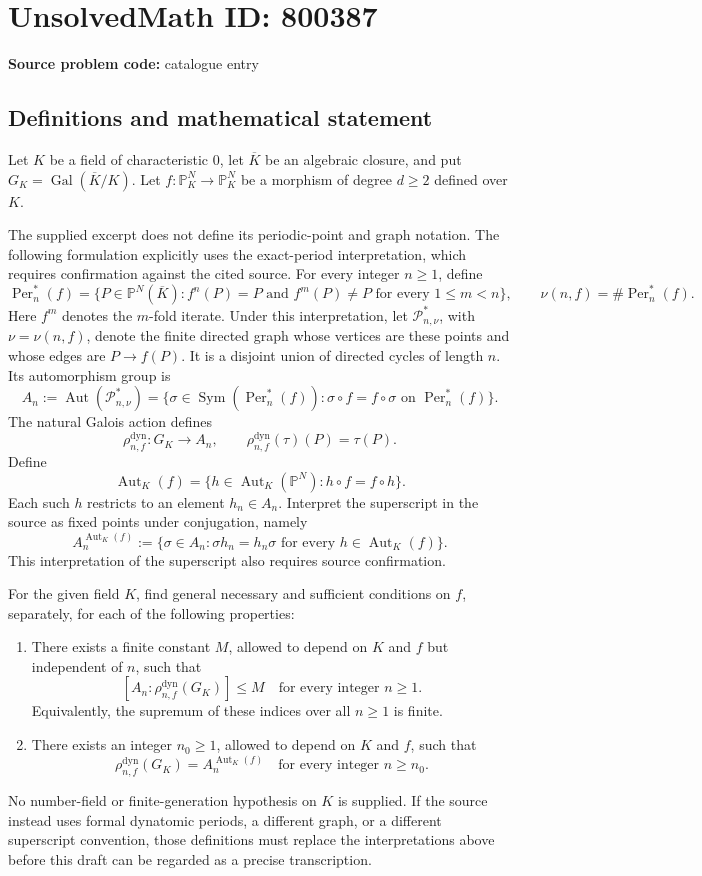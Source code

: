 \documentclass[11pt]{article}
\newcommand{\PP}{\mathbb{P}}
\begin{document}
\section*{UnsolvedMath ID: 800387}
\textbf{Source problem code:} catalogue entry
\subsection{Definitions and mathematical statement}
Let \(K\) be a field of characteristic \(0\), let \(\overline K\) be an algebraic closure, and put \(G_K=\operatorname{Gal}(\overline K/K)\). Let \(f:\PP^N_K\to\PP^N_K\) be a morphism of degree \(d\geq 2\) defined over \(K\).

The supplied excerpt does not define its periodic-point and graph notation. The following formulation explicitly uses the exact-period interpretation, which requires confirmation against the cited source. For every integer \(n\geq 1\), define
\[
\operatorname{Per}_n^*(f)=\{P\in\PP^N(\overline K): f^n(P)=P\text{ and }f^m(P)\neq P\text{ for every }1\leq m<n\},
\qquad \nu(n,f)=\#\operatorname{Per}_n^*(f).
\]
Here \(f^m\) denotes the \(m\)-fold iterate. Under this interpretation, let \(\mathcal P_{n,\nu}^*\), with \(\nu=\nu(n,f)\), denote the finite directed graph whose vertices are these points and whose edges are \(P\to f(P)\). It is a disjoint union of directed cycles of length \(n\). Its automorphism group is
\[
A_n:=\operatorname{Aut}(\mathcal P_{n,\nu}^*)
=\{\sigma\in\operatorname{Sym}(\operatorname{Per}_n^*(f)):
\sigma\circ f=f\circ\sigma\text{ on }\operatorname{Per}_n^*(f)\}.
\]
The natural Galois action defines
\[
\rho_{n,f}^{\mathrm{dyn}}:G_K\longrightarrow A_n,
\qquad \rho_{n,f}^{\mathrm{dyn}}(\tau)(P)=\tau(P).
\]
Define
\[
\operatorname{Aut}_K(f)=\{h\in\operatorname{Aut}_K(\PP^N):h\circ f=f\circ h\}.
\]
Each such \(h\) restricts to an element \(h_n\in A_n\). Interpret the superscript in the source as fixed points under conjugation, namely
\[
A_n^{\operatorname{Aut}_K(f)}
:=\{\sigma\in A_n:\sigma h_n=h_n\sigma\text{ for every }h\in\operatorname{Aut}_K(f)\}.
\]
This interpretation of the superscript also requires source confirmation.

For the given field \(K\), find general necessary and sufficient conditions on \(f\), separately, for each of the following properties:
\begin{enumerate}
\item[(a)] There exists a finite constant \(M\), allowed to depend on \(K\) and \(f\) but independent of \(n\), such that
\[
[A_n:\rho_{n,f}^{\mathrm{dyn}}(G_K)]\leq M
\quad\text{for every integer }n\geq 1.
\]
Equivalently, the supremum of these indices over all \(n\geq 1\) is finite.
\item[(b)] There exists an integer \(n_0\geq 1\), allowed to depend on \(K\) and \(f\), such that
\[
\rho_{n,f}^{\mathrm{dyn}}(G_K)
=A_n^{\operatorname{Aut}_K(f)}
\quad\text{for every integer }n\geq n_0.
\]
\end{enumerate}
No number-field or finite-generation hypothesis on \(K\) is supplied. If the source instead uses formal dynatomic periods, a different graph, or a different superscript convention, those definitions must replace the interpretations above before this draft can be regarded as a precise transcription.
\end{document}
